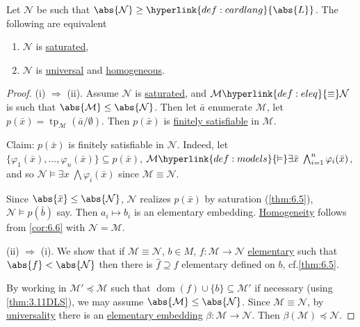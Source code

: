 \documentclass{article}
\let\models\vDash
\DeclareMathOperator{\dom}{dom}
\DeclareMathOperator{\tp}{tp}
\renewcommand{\N}{\mathcal{N}}
\begin{document}
\begin{nthm}\label{thm:6.10}
  Let $\mathcal{N}$ be such that $\abs{\mathcal{N}} \geq \hyperlink{def:cardlang}{\abs{L}}$. The following are equivalent
  \begin{enumerate}[label=(\roman*)]
    \item $\mathcal{N}$ is \hyperlink{def:sat}{saturated},
    \item $\mathcal{N}$ is \hyperlink{def:univ}{universal} and \hyperlink{def:homogeneous}{homogeneous}.
  \end{enumerate}
\end{nthm}
\begin{proof}
  (i) $\Rightarrow$ (ii). Assume $\mathcal{N}$ is \hyperlink{def:sat}{saturated}, and $\mathcal{M} \hyperlink{def:eleq}{\equiv} \mathcal{N}$ is such that $\abs{\mathcal{M}} \leq \abs{\mathcal{N}}$.
  Then let $\bar{a}$ enumerate $\mathcal{M}$, let $p(\bar{x}) = \tp_\mathcal{M}(\bar{a}/\emptyset)$.
  Then $p(\bar{x})$ is \hyperlink{def:type}{finitely satisfiable} in $\mathcal{M}$.

  Claim: $p(\bar{x})$ is finitely satisfiable in $\mathcal{N}$.
  Indeed, let $\{\varphi_1(\bar{x}), \dotsc, \varphi_n(\bar{x})\} \subseteq p(\bar{x})$, $\mathcal{M} \hyperlink{def:models}{\models} \exists \bar{x} \; \bigwedge _{i=1}^n \varphi_i(\bar{x})$, and so $\mathcal{N} \models \exists x \; \bigwedge \varphi_i(\bar{x})$ since $\mathcal{M} \equiv \mathcal{N}$.

  Since $\abs{\bar{x}} \leq \abs{\mathcal{N}}$, $\mathcal{N}$ realizes $p(\bar{x})$ by saturation (\cref{thm:6.5}), $\N \models p(\bar b)$ say. Then $a_i \mapsto b_i$ is an elementary embedding.
  \hyperlink{def:homogeneous}{Homogeneity} follows from \cref{cor:6.6} with $\mathcal{N} = \mathcal{M}$.

  (ii) $\Rightarrow$ (i). We show that if $\mathcal{M} \equiv \mathcal{N}$, $b \in M$, $f: \mathcal{M} \to \mathcal{N}$ \hyperlink{def:elmap}{elementary} such that $\abs{f} < \abs{\mathcal{N}}$ then there is $\hat{f} \supseteq f$ elementary defined on $b$, cf.\@ \cref{thm:6.5}.

  By working in $\mathcal{M}' \preccurlyeq \mathcal{M}$ such that $\dom(f) \cup \{b\} \subseteq \mathcal{M}'$ if necessary (using \cref{thm:3.11DLS}), we may assume $\abs{\mathcal{M}} \leq \abs{\mathcal{N}}$.
  Since $\mathcal{M} \equiv \mathcal{N}$, by \hyperlink{def:univ}{universality} there is an \hyperlink{def:el}{elementary embedding} $\beta: \mathcal{M} \to \mathcal{N}$. Then $\beta(\mathcal{M}) \preccurlyeq \mathcal{N}$.


\end{proof}
\end{document}
